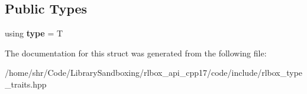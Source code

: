 \subsection*{Public Types}
\begin{DoxyCompactItemize}
\item 
\mbox{\label{structrlbox_1_1detail_1_1convert__detail_1_1convert__base__types__t__helper_3_01T_00_01T__ShortT29e53cddbfe80e82d3bacb7238c231fa_a8b52923d55eb9ff6714673de0dddccd0}} 
using {\bfseries type} = T
\end{DoxyCompactItemize}


The documentation for this struct was generated from the following file\+:\begin{DoxyCompactItemize}
\item 
/home/shr/\+Code/\+Library\+Sandboxing/rlbox\+\_\+api\+\_\+cpp17/code/include/rlbox\+\_\+type\+\_\+traits.\+hpp\end{DoxyCompactItemize}
